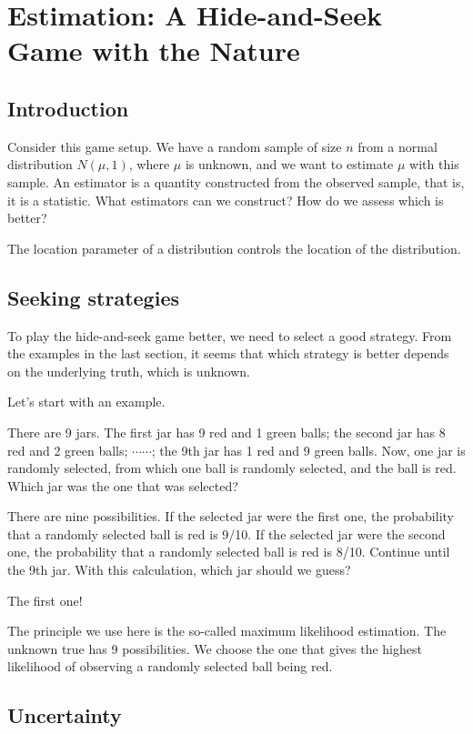 \hypertarget{ch:estimation}{%
\chapter{Estimation: A Hide-and-Seek Game with the Nature}\label{ch:estimation}}


\section{Introduction}
Consider this game setup. We have a random sample of size \(n\) from a normal
distribution \(N(\mu, 1)\), where \(\mu\) is unknown, and we want to estimate \(\mu\)
with this sample. An estimator is a quantity constructed from the observed
sample, that is, it is a statistic. What estimators can we construct? How do we
assess which is better?



The location parameter of a distribution controls the location of the
distribution.


\section{Seeking strategies}

To play the hide-and-seek game better, we need to select a good strategy. From
the examples in the last section, it seems that which strategy is better depends
on the underlying truth, which is unknown.


Let's start with an example.
\begin{illustration}
\label{example:has-jars}
There are 9 jars. The first jar has 9 red and 1 green balls; the second jar has
8 red and 2 green balls; $\cdots\cdots$; the 9th jar has 1 red and 9 green
balls. Now, one jar is randomly selected, from which one ball is randomly
selected, and the ball is red. Which jar was the one that was selected?

There are nine possibilities. If the selected jar were the first one, the
probability that a randomly selected ball is red is 9/10. If the selected jar
were the second one, the probability that a randomly selected ball is red is
8/10. Continue until the 9th jar. With this calculation, which jar should we
guess?

The first one!
\end{illustration}

The principle we use here is the so-called maximum likelihood estimation. The
unknown true has 9 possibilities. We choose the one that gives the highest
likelihood of observing a randomly selected ball being red.

\section{Uncertainty}





